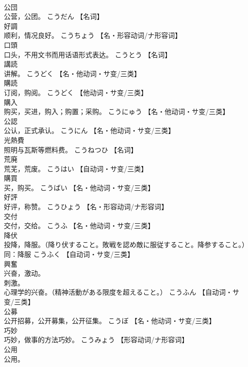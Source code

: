 \documentclass[8pt]{extreport}
\begin{document}
\begin{CJK}{UTF8}{min}
\\	公団	
\\	公营，公团。	こうだん		【名词】
\\	好調	
\\	顺利，情况良好。	こうちょう		【名・形容动词/ナ形容词】
\\	口頭	
\\	口头，不用文书而用话语形式表达。	こうとう		【名词】
\\	講読	
\\	讲解。	こうどく		【名・他动词・サ变/三类】
\\	購読	
\\	订阅，购阅。	こうどく		【他动词・サ变/三类】
\\	購入	
\\	购买，买进，购入；购置；采购。	こうにゅう		【名・他动词・サ变/三类】
\\	公認	
\\	公认，正式承认。	こうにん		【名・他动词・サ变/三类】
\\	光熱費	
\\	照明与瓦斯等燃料费。	こうねつひ		【名词】
\\	荒廃	
\\	荒芜，荒废。	こうはい		【自动词・サ变/三类】
\\	購買	
\\	买，购买。	こうばい		【名・他动词・サ变/三类】
\\	好評	
\\	好评，称赞。	こうひょう		【名・形容动词/ナ形容词】
\\	交付	
\\	交付，交给。	こうふ		【名・他动词・サ变/三类】
\\	降伏	
\\	投降，降服。（降り伏すること。敗戦を認め敵に服従すること。降参すること。） 
\\	同：降服	こうふく		【自动词・サ变/三类】
\\	興奮	
\\	兴奋，激动。 
\\	刺激。 
\\	心理学的兴奋。（精神活動がある限度を超えること。）	こうふん		【自动词・サ变/三类】
\\	公募	
\\	公开招募，公开募集，公开征集。	こうぼ		【名・他动词・サ变/三类】
\\	巧妙	
\\	巧妙，做事的方法巧妙。	こうみょう		【形容动词/ナ形容词】
\\	公用	
\\	公用。 

\end{CJK}
\end{document}
